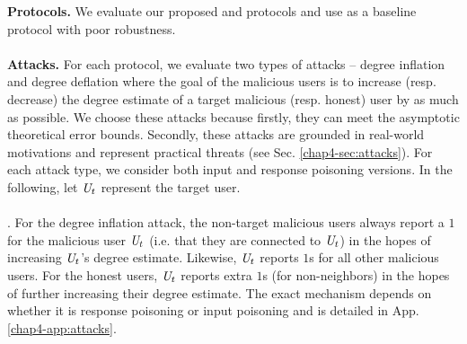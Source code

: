 \noindent \textbf{Protocols.} 
We evaluate our proposed \DegRRCheck{} and \DegHybrid{} protocols and use \DegRRNaive{} as a baseline protocol with poor robustness. %
\vspace{-0.2cm}\\\\
\noindent\textbf{Attacks.} For each protocol, we evaluate two types of attacks -- degree inflation and degree deflation where the goal of the malicious users is to increase (resp. decrease) the degree estimate of a target malicious (resp. honest) user by as much as possible.
 We choose these attacks because firstly, they can meet the asymptotic theoretical error bounds.
Secondly, these attacks are grounded in real-world motivations and represent practical threats (see Sec. \ref{chap4-sec:attacks}). For each attack type, we consider both input and response poisoning versions. In the following, let $\textit{U}_t$ represent the target user. 
\vspace{-0.2cm}\\\\
\noindent\DegRRCheck{}. For the degree inflation attack, the non-target malicious users always report a $1$  for the malicious user $\textit{U}_t$ (i.e. that they are connected to $\textit{U}_t$) in the hopes of increasing $\textit{U}_t$'s degree estimate.
Likewise, $\textit{U}_t$ reports $1$s for all other malicious users. For the honest users, $\textit{U}_t$ reports extra $1$s (for non-neighbors) in the hopes of further increasing their degree estimate. The exact mechanism depends on whether it is response poisoning or input poisoning and is detailed in App. \ref{chap4-app:attacks}.

